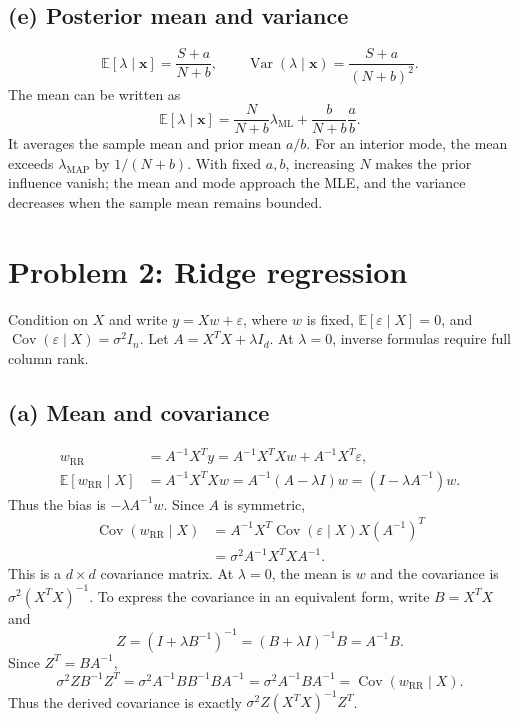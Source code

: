 \documentclass[10pt]{article}
\newcommand{\E}{\mathbb{E}}
\newcommand{\Var}{\operatorname{Var}}
\newcommand{\Cov}{\operatorname{Cov}}
\begin{document}
\subsection*{(e) Posterior mean and variance}
\[
\E[\lambda\mid\mathbf{x}]=\frac{S+a}{N+b},\qquad
\Var(\lambda\mid\mathbf{x})=\frac{S+a}{(N+b)^2}.
\]
The mean can be written as
\[
\E[\lambda\mid\mathbf{x}]=\frac{N}{N+b}\lambda_{\mathrm{ML}}+\frac{b}{N+b}\frac{a}{b}.
\]
It averages the sample mean and prior mean $a/b$. For an interior mode, the mean exceeds $\lambda_{\mathrm{MAP}}$ by $1/(N+b)$. With fixed $a,b$, increasing $N$ makes the prior influence vanish; the mean and mode approach the MLE, and the variance decreases when the sample mean remains bounded.
\clearpage
\section*{Problem 2: Ridge regression}
Condition on $X$ and write $y=Xw+\varepsilon$, where $w$ is fixed,
$\E[\varepsilon\mid X]=0$, and $\Cov(\varepsilon\mid X)=\sigma^2I_n$.
Let $A=X^TX+\lambda I_d$. At $\lambda=0$, inverse formulas require full column rank.
\subsection*{(a) Mean and covariance}
\begin{align*}
w_{\mathrm{RR}}&=A^{-1}X^Ty
=A^{-1}X^TXw+A^{-1}X^T\varepsilon,\\
\E[w_{\mathrm{RR}}\mid X]&=A^{-1}X^TXw
=A^{-1}(A-\lambda I)w
=(I-\lambda A^{-1})w.
\end{align*}
Thus the bias is $-\lambda A^{-1}w$. Since $A$ is symmetric,
\begin{align*}
\Cov(w_{\mathrm{RR}}\mid X)
&=A^{-1}X^T\Cov(\varepsilon\mid X)X(A^{-1})^T\\
&=\sigma^2 A^{-1}X^TXA^{-1}.
\end{align*}
This is a $d\times d$ covariance matrix. At $\lambda=0$, the mean is $w$ and the covariance is $\sigma^2(X^TX)^{-1}$.
To express the covariance in an equivalent form, write $B=X^TX$ and
\[
Z=(I+\lambda B^{-1})^{-1}=(B+\lambda I)^{-1}B=A^{-1}B.
\]
Since $Z^T=BA^{-1}$,
\[
\sigma^2 ZB^{-1}Z^T=\sigma^2 A^{-1}BB^{-1}BA^{-1}
=\sigma^2 A^{-1}BA^{-1}=\Cov(w_{\mathrm{RR}}\mid X).
\]
Thus the derived covariance is exactly $\sigma^2 Z(X^TX)^{-1}Z^T$.
\end{document}
